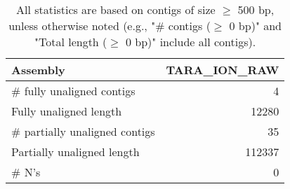 \documentclass[12pt,a4paper]{article}
\begin{document}
\begin{table}[ht]
\begin{center}
\caption{All statistics are based on contigs of size $\geq$ 500 bp, unless otherwise noted (e.g., "\# contigs ($\geq$ 0 bp)" and "Total length ($\geq$ 0 bp)" include all contigs).}
\begin{tabular}{|l*{1}{|r}|}
\hline
Assembly & TARA\_ION\_RAW \\ \hline
\# fully unaligned contigs & 4 \\ \hline
Fully unaligned length & 12280 \\ \hline
\# partially unaligned contigs & 35 \\ \hline
Partially unaligned length & 112337 \\ \hline
\# N's & 0 \\ \hline
\end{tabular}
\end{center}
\end{table}
\end{document}
